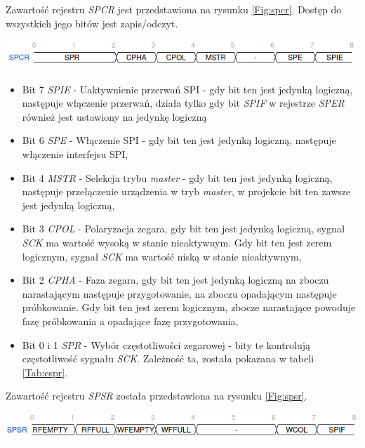 \documentclass[11pt,a4paper]{article}
\begin{document}
\\\\
Zawartość rejestru \textit{SPCR} jest przedstawiona na rysunku \ref{Fig:spcr}. Dostęp do wszystkich jego bitów jest zapis/odczyt.\\
\begin{minipage}[c]{\textwidth}

					\includegraphics[width=\textwidth]{./rysunki/spcr.png}
			\end{minipage} 
			\begin{itemize}
				\item Bit 7 \textit{SPIE} - Uaktywnienie przerwań SPI - gdy bit ten jest jedynką logiczną, następuje włączenie przerwań, działa tylko gdy bit \textit{SPIF} w rejestrze \textit{SPER} również jest ustawiony na jedynkę logiczną
				\item Bit 6 \textit{SPE} - Włączenie SPI - gdy bit ten jest jedynką logiczną, następuje włączenie interfejsu SPI,
				\item Bit 4 \textit{MSTR} - Selekcja trybu \textit{master} - gdy bit ten jest jedynką logiczną, następuje przełączenie urządzenia w tryb \textit{master}, w projekcie bit ten zawsze jest jedynką logiczną,
				\item Bit 3 \textit{CPOL} - Polaryzacja zegara, gdy bit ten jest jedynką logiczną, sygnał \textit{SCK} ma wartość wysoką w stanie nieaktywnym. Gdy bit ten jest zerem logicznym, sygnał \textit{SCK} ma wartość niską w stanie nieaktywnym,
				\item Bit 2 \textit{CPHA} - Faza zegara, gdy bit ten jest jedynką logiczną na zboczu narastającym następuje przygotowanie, na zboczu opadającym następuje próbkowanie. Gdy bit ten jest zerem logicznym, zbocze narastające powoduje fazę próbkowania a opadające fazę przygotowania,
				\item Bit 0 i 1 \textit{SPR} - Wybór częstotliwości zegarowej - bity te kontrolują częstotliwość sygnału \textit{SCK}. Zależność ta, została pokazana w tabeli \ref{Tab:espr}.
			\end{itemize}
Zawartość rejestru \textit{SPSR} została przedstawiona na rysunku \ref{Fig:spsr}.\\
\begin{minipage}[c]{\textwidth}

					\includegraphics[width=\textwidth]{./rysunki/spsr.png}
			\end{minipage} 
\end{document}
